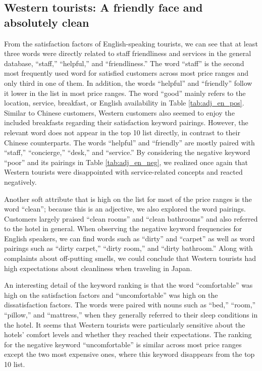 \documentclass[smallextended,natbib]{svjour3}       %
\begin{document}
  \subsection{Western tourists: A friendly face and absolutely clean}\label{disc:en}

    From the satisfaction factors of English-speaking tourists, we can see that at least three words were directly related to staff friendliness and services in the general database, ``staff,'' ``helpful,'' and ``friendliness.'' The word ``staff'' is the second most frequently used word for satisfied customers across most price ranges and only third in one of them. In addition, the words ``helpful'' and ``friendly'' follow it lower in the list in most price ranges. The word ``good'' mainly refers to the location, service, breakfast, or English availability in Table \ref{tab:adj_en_pos}. Similar to Chinese customers, Western customers also seemed to enjoy the included breakfasts regarding their satisfaction keyword pairings. However, the relevant word does not appear in the top 10 list directly, in contrast to their Chinese counterparts. The words ``helpful'' and ``friendly'' are mostly paired with ``staff,'' ``concierge,'' ``desk,'' and ``service.'' By considering the negative keyword ``poor'' and its pairings in Table \ref{tab:adj_en_neg}, we realized once again that Western tourists were disappointed with service-related concepts and reacted negatively.

    Another soft attribute that is high on the list for most of the price ranges is the word ``clean''; because this is an adjective, we also explored the word pairings. Customers largely praised ``clean rooms'' and ``clean bathrooms'' and also referred to the hotel in general. When observing the negative keyword frequencies for English speakers, we can find words such as ``dirty'' and ``carpet'' as well as word pairings such as ``dirty carpet,'' ``dirty room,'' and ``dirty bathroom.'' Along with complaints about off-putting smells, we could conclude that Western tourists had high expectations about cleanliness when traveling in Japan.

    An interesting detail of the keyword ranking is that the word ``comfortable'' was high on the satisfaction factors and ``uncomfortable'' was high on the dissatisfaction factors. The words were paired with nouns such as ``bed,'' ``room,'' ``pillow,'' and ``mattress,'' when they generally referred to their sleep conditions in the hotel.
    It seems that Western tourists were particularly sensitive about the hotels’ comfort levels and whether they reached their expectations. The ranking for the negative keyword ``uncomfortable'' is similar across most price ranges except the two most expensive ones, where this keyword disappears from the top 10 list.
\end{document}
